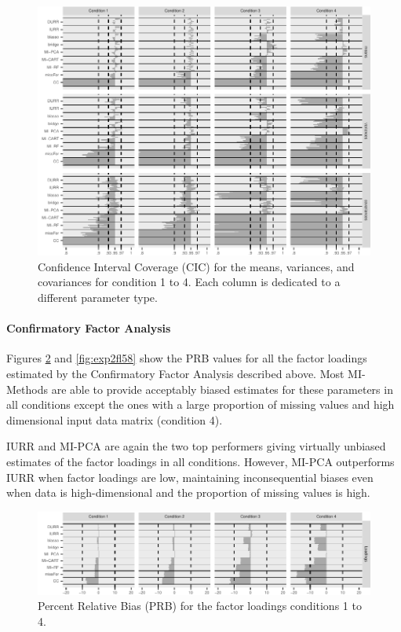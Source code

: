 \begin{figure}
	\includegraphics[width=\textwidth]{../../output/graphs/exp2_semR_ci_14.pdf}
\caption{Confidence Interval Coverage (CIC) for the means, variances, and covariances for condition 1 to 4.
	Each column is dedicated to a different parameter type.}
\label{fig:exp2cir}
\end{figure}

\FloatBarrier %

\paragraph{Confirmatory Factor Analysis}

	Figures \ref{fig:exp2fl14} and \ref{fig:exp2fl58} show the PRB values for all the factor loadings estimated by
	the Confirmatory Factor Analysis described above. 
	Most MI-Methods are able to provide acceptably biased estimates for these parameters in 
	all conditions except the ones with a large proportion of missing values and high 
	dimensional input data matrix (condition 4).

	IURR and MI-PCA are again the two top performers giving virtually unbiased estimates
	of the factor loadings in all conditions.
	However, MI-PCA outperforms IURR when factor loadings are low, maintaining inconsequential 
	biases even when data is high-dimensional and the proportion of missing values is high.

\begin{figure}
	\includegraphics[width=\textwidth]{../../output/graphs/exp2_CFA_lambda_BPR_14.pdf}
\caption{Percent Relative Bias (PRB) for the factor loadings conditions 1 to 4.}
\label{fig:exp2fl14}
\end{figure}

